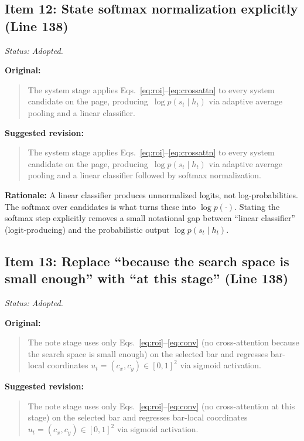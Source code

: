 \documentclass{article}
\begin{document}
\subsection*{Item 12: State softmax normalization explicitly (Line 138)}

\textit{Status: Adopted.}

\textbf{Original:}
\begin{quote}
The system stage applies Eqs.~\ref{eq:roi}--\ref{eq:crossattn} to every system candidate on the page, producing~$\log p(s_t \mid h_t)$ via adaptive average pooling and a linear classifier.
\end{quote}

\textbf{Suggested revision:}
\begin{quote}
The system stage applies Eqs.~\ref{eq:roi}--\ref{eq:crossattn} to every system candidate on the page, producing~$\log p(s_t \mid h_t)$ via adaptive average pooling and a linear classifier followed by softmax normalization.
\end{quote}

\textbf{Rationale:}
A linear classifier produces unnormalized logits, not log-probabilities. The softmax over candidates is what turns these into $\log p(\cdot)$. Stating the softmax step explicitly removes a small notational gap between ``linear classifier'' (logit-producing) and the probabilistic output $\log p(s_t \mid h_t)$.

\subsection*{Item 13: Replace ``because the search space is small enough'' with ``at this stage'' (Line 138)}

\textit{Status: Adopted.}

\textbf{Original:}
\begin{quote}
The note stage uses only Eqs.~\ref{eq:roi}--\ref{eq:conv} (no cross-attention because the search space is small enough) on the selected bar and regresses bar-local coordinates $u_t = (c_x, c_y) \in [0,1]^2$ via sigmoid activation.
\end{quote}

\textbf{Suggested revision:}
\begin{quote}
The note stage uses only Eqs.~\ref{eq:roi}--\ref{eq:conv} (no cross-attention at this stage) on the selected bar and regresses bar-local coordinates $u_t = (c_x, c_y) \in [0,1]^2$ via sigmoid activation.
\end{quote}
\end{document}
